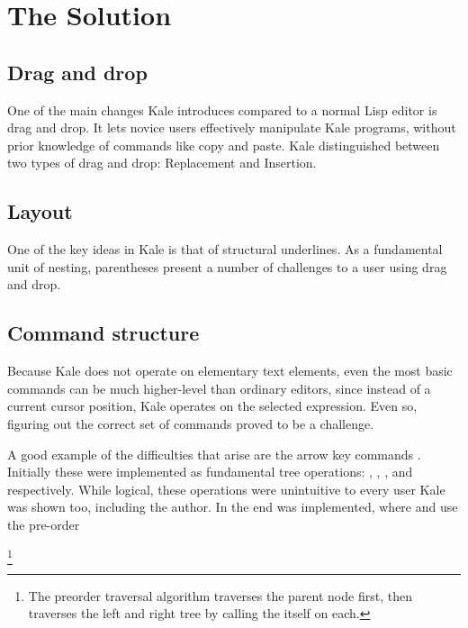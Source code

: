 \documentclass[11pt]{report}
\begin{document}
\chapter{The Solution}

\section{Drag and drop}

One of the main changes Kale introduces compared to a normal Lisp editor is
drag and drop. It lets novice users effectively manipulate Kale programs,
without prior knowledge of commands like copy and paste. Kale distinguished
between two types of drag and drop: Replacement and Insertion. 

\section{Layout}

One of the key ideas in Kale is that of structural underlines. As a
fundamental unit of nesting, parentheses present a number of challenges to a
user using drag and drop.

\section{Command structure}

Because Kale does not operate on elementary text elements, even the most
basic
commands can be much higher-level than ordinary editors, since instead of a
current cursor position, Kale operates on the selected expression. Even so,
figuring out the correct set of commands proved to be a challenge.

\newcommand{\ak}[1]{\keys{\arrowkey{#1}}}
A good example of the difficulties that arise are the arrow key commands
\ak{^} \ak{v} \ak{<} \ak{>}. Initially these were implemented as
fundamental tree operations: , ,
, and  respectively.
While logical, these operations were unintuitive to every user
Kale was shown too, including the author. In the end  was
implemented, where \ak{<} and \ak{>} use the pre-order

\footnote{The preorder traversal algorithm traverses the parent node first,
then traverses the left and right tree by calling the itself on each.}
\end{document}
